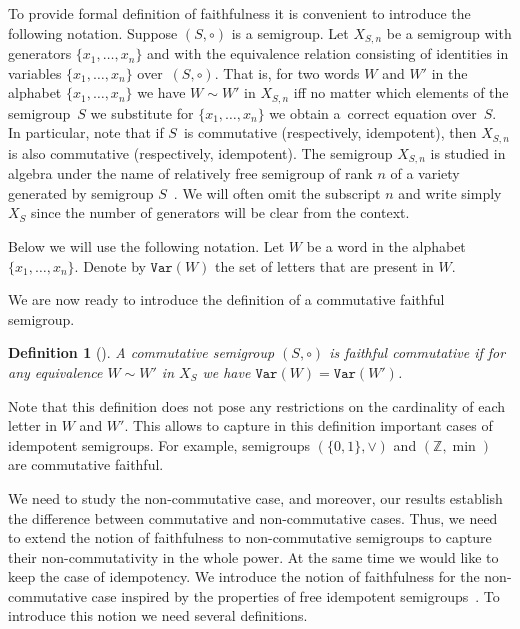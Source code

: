 \documentclass[11pt,letterpaper]{article}
\newtheorem{definition}{Definition}
\newcommand{\var}{\texttt{Var}}
\begin{document}
To provide formal definition of faithfulness it is convenient to introduce the following notation.
Suppose $(S, \circ)$ is a
semigroup. Let $X_{S,n}$ be a semigroup with generators $\{x_1,\ldots, x_n\}$
and with the equivalence relation consisting of identities in variables
$\{x_1,\ldots, x_n\}$ over~$(S,\circ)$. That is, for two words $W$ and $W'$ in
the alphabet $\{x_1,\ldots,x_n\}$ we have $W\sim W'$ in $X_{S,n}$ iff no matter which
elements of the semigroup~$S$ we substitute for $\{x_1,\ldots, x_n\}$ we obtain
a~correct equation over~$S$. In particular, note that if $S$~is commutative
(respectively, idempotent), then $X_{S,n}$ is also commutative (respectively,
idempotent).
The semigroup $X_{S,n}$ is studied in algebra under the name of relatively free semigroup of rank $n$ of a variety generated by semigroup $S$~\cite{neumann2012varieties}.
We will often omit the subscript $n$ and write simply $X_S$ since the number of generators will be clear from the context.

Below we will use the following notation. Let $W$ be a word in the alphabet
$\{x_1,\ldots, x_n\}$. Denote by $\var(W)$ the set of letters that are present
in $W$.


We are now ready to introduce the definition of a commutative faithful semigroup.

\begin{definition}[\cite{DBLP:conf/stoc/Yao82,DBLP:journals/ijcga/ChazelleR91}]
A commutative semigroup $(S, \circ)$ is \emph{faithful commutative} if for any
equivalence $W\sim W'$ in $X_S$ we have $\var(W)=\var(W')$.
\end{definition}

Note that this definition does not pose any restrictions on the cardinality of
each letter in $W$ and $W'$. This allows to capture in this definition
important cases of idempotent semigroups. For example, semigroups
$(\{0,1\}, \vee)$ and $(\mathbb{Z},\min)$ are commutative faithful.

We need to study the non-commutative case, and moreover, our results
establish the difference between commutative and non-commutative cases. Thus,
we need to extend the notion of faithfulness to non-commutative semigroups to
capture their non-commutativity in the whole power. At the same time we would
like to keep the case of idempotency. We introduce the notion of faithfulness
for the non-commutative case inspired by the properties of free idempotent
semigroups~\cite{GreenR52}. To introduce this notion we need several
definitions.
\end{document}
